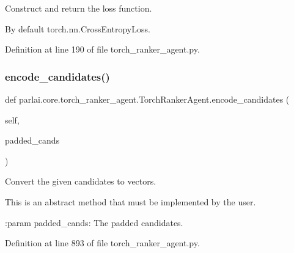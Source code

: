 \begin{DoxyVerb}Construct and return the loss function.

By default torch.nn.CrossEntropyLoss.
\end{DoxyVerb}
 

Definition at line 190 of file torch\+\_\+ranker\+\_\+agent.\+py.

\mbox{\label{classparlai_1_1core_1_1torch__ranker__agent_1_1TorchRankerAgent_a1c8e4925f558783a51a28ccb577c42c7}} 
\subsubsection{\texorpdfstring{encode\+\_\+candidates()}{encode\_candidates()}}
{\footnotesize\ttfamily def parlai.\+core.\+torch\+\_\+ranker\+\_\+agent.\+Torch\+Ranker\+Agent.\+encode\+\_\+candidates (\begin{DoxyParamCaption}\item[{}]{self,  }\item[{}]{padded\+\_\+cands }\end{DoxyParamCaption})}

\begin{DoxyVerb}Convert the given candidates to vectors.

This is an abstract method that must be implemented by the user.

:param padded_cands:
    The padded candidates.
\end{DoxyVerb}
 

Definition at line 893 of file torch\+\_\+ranker\+\_\+agent.\+py.



